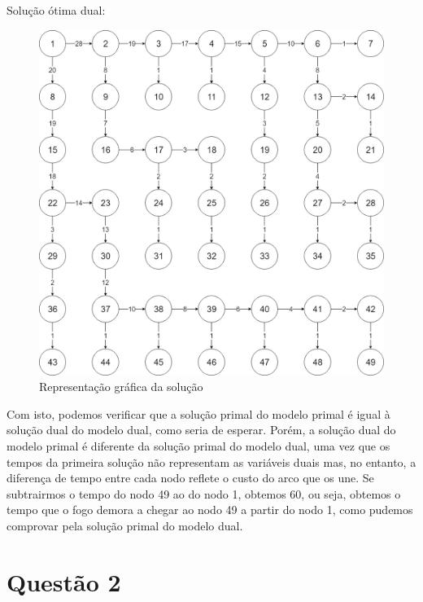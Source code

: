 \documentclass[11pt]{article} %
\begin{document}
\newpage
Solução ótima dual:

	\begin{figure}[!htpb]
		\centering
    		\includegraphics[width=5in]{grafo1c.png}
    		\caption{Representação gráfica da solução}
	\end{figure}
	
Com isto, podemos verificar que a solução primal do modelo primal é igual à solução dual do modelo dual, como seria de esperar. Porém, a solução dual do modelo primal é diferente da solução primal do modelo dual, uma vez que os tempos da primeira solução não representam as variáveis duais mas, no entanto, a diferença de tempo entre cada nodo reflete o custo do arco que os une. Se subtrairmos o tempo do nodo 49 ao do nodo 1, obtemos 60, ou seja, obtemos o tempo que o fogo demora a chegar ao nodo 49 a partir do nodo 1, como pudemos comprovar pela solução primal do modelo dual.

\newpage

\section*{Questão 2}
\end{document}
